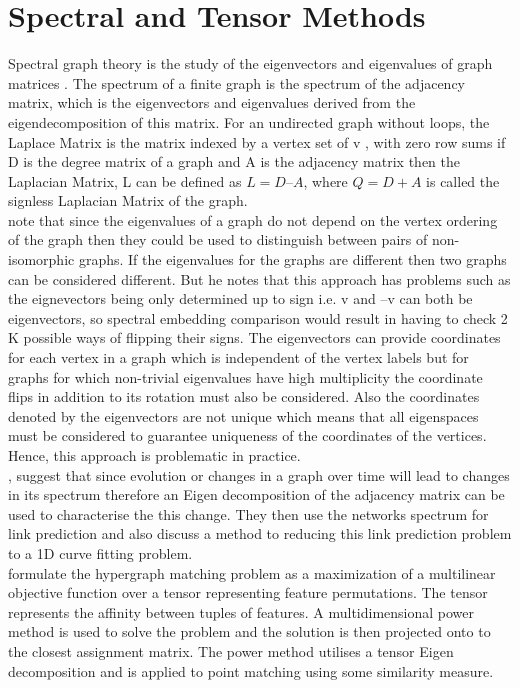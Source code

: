 \section{Spectral and Tensor Methods}

Spectral graph theory is the study of the eigenvectors and eigenvalues of graph matrices \cite{Spielman2007}. The spectrum of a finite graph is the spectrum of the adjacency matrix, which is the eigenvectors and eigenvalues derived from the eigendecomposition of this matrix. For an undirected graph without loops, the Laplace Matrix is the matrix indexed by a vertex set of v , with zero row sums if D is the degree matrix of a graph and A is the adjacency matrix then the Laplacian Matrix, L can be defined as $L = D – A$, where $Q = D + A$ is called the signless Laplacian Matrix of the graph. \cite{Spielman2007, Kunegis2013,Brouwer2012}\\


\citeauthor{Spielman2007}\cite{Spielman2007} note that since the eigenvalues of a graph do not depend on the vertex
ordering of the graph then they could be used to distinguish between pairs of non-isomorphic graphs. If the eigenvalues for the graphs are different then two graphs can be considered different. But he notes that this approach has problems such as the eignevectors being only determined up to sign i.e. v and –v can both be eigenvectors, so spectral embedding
comparison would result in having to check 2 K possible ways of flipping their signs. The eigenvectors can provide coordinates for each vertex in a graph which is independent of the vertex labels but for graphs for which non-trivial eigenvalues have high multiplicity the coordinate flips in addition to its rotation must also be considered. Also the coordinates denoted by the eigenvectors are not unique which means that all eigenspaces must be considered to guarantee uniqueness of the coordinates of the vertices. Hence, this approach is problematic in practice. \\

\citeauthor{Kunegis2013}\cite{Kunegis2013}, suggest that since evolution or changes in a graph over time will
lead to changes in its spectrum therefore an Eigen decomposition of the adjacency matrix can be used to characterise the this change. They then use the networks spectrum for link prediction and also discuss a method to reducing this link prediction problem to a 1D curve fitting problem. \\

\citeauthor{Duchenne2014}\cite{Duchenne2014} formulate the hypergraph matching problem as a maximization of a multilinear objective function over a tensor representing feature permutations. The tensor represents the affinity between tuples of features. A multidimensional power method is used to solve the problem and the solution is then projected onto to the closest assignment matrix. The power method utilises a tensor Eigen decomposition and is applied to point matching
using some similarity measure.

